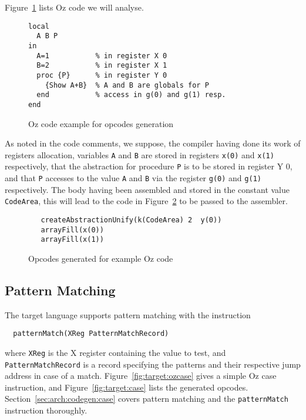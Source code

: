 \documentclass[a4paper]{memoir}
\begin{document}
Figure~\ref{fig:opcodes:procedures:example} lists Oz code we will analyse.

\begin{figure}[ht]
\begin{lstlisting}
local
  A B P
in
  A=1           % in register X 0
  B=2           % in register X 1
  proc {P}      % in register Y 0
    {Show A+B}  % A and B are globals for P
  end           % access in g(0) and g(1) resp.
end
\end{lstlisting}
\caption{Oz code example for opcodes generation}
\label{fig:opcodes:procedures:example}
\end{figure}


As noted in the code comments, we suppose, the compiler having done its work of
registers allocation, variables \lstinline!A! and \lstinline!B! are stored in
registers \lstinline!x(0)! and \lstinline!x(1)!
respectively, that the abstraction for procedure \lstinline!P! is to be stored in register Y
0, and that \lstinline!P! accesses to the value \lstinline!A! and \lstinline!B!
via the register \lstinline!g(0)! and \lstinline!g(1)!
respectively.
The body having been assembled and stored in the constant value
\lstinline!CodeArea!, this
will lead to the code in Figure~\ref{fig:opcodes:procedures:result} to be passed
to the assembler.
\begin{figure}[ht]
\begin{lstlisting}
   createAbstractionUnify(k(CodeArea) 2  y(0))
   arrayFill(x(0))
   arrayFill(x(1))
\end{lstlisting}
\caption{Opcodes generated for example Oz code}
\label{fig:opcodes:procedures:result}
\end{figure}

\subsection{Pattern Matching}
The target language supports pattern matching with the instruction
\begin{lstlisting}
  patternMatch(XReg PatternMatchRecord)
\end{lstlisting}
where \lstinline!XReg! is the X register containing the value to test, and
\lstinline!PatternMatchRecord! is a record specifying the patterns and their
respective jump address in case of a match.
Figure~\ref{fig:target:ozcase} gives a simple Oz case instruction, and Figure~\ref{fig:target:case} lists the generated opcodes.
Section~\ref{sec:arch:codegen:case} covers pattern matching and the \lstinline!patternMatch! instruction thoroughly.
 
\end{document}
